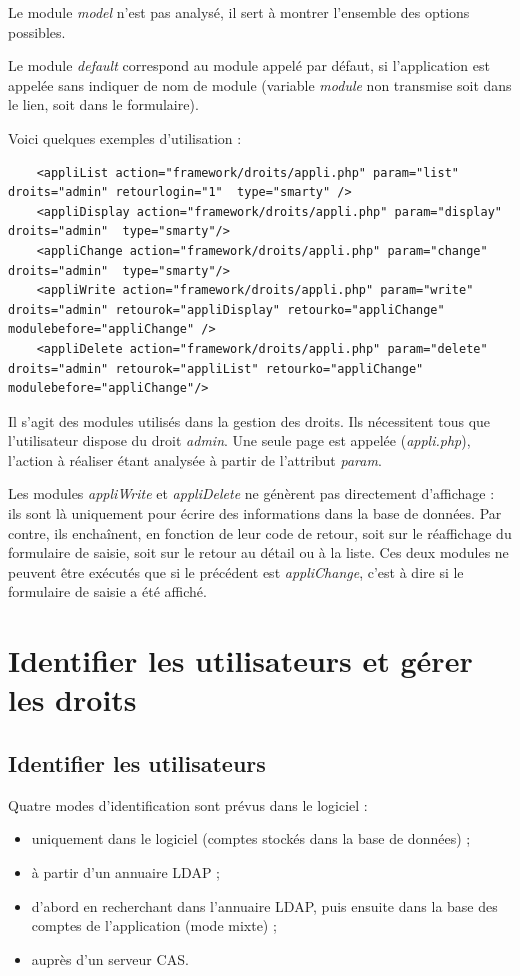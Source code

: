 Le module \textit{model} n'est pas analysé, il sert à montrer l'ensemble des options possibles. 

Le module \textit{default} correspond au module appelé par défaut, si l'application est appelée sans indiquer de nom de module (variable \textit{module} non transmise soit dans le lien, soit dans le formulaire).

Voici quelques exemples d'utilisation :
\begin{lstlisting}
	<appliList action="framework/droits/appli.php" param="list" droits="admin" retourlogin="1"  type="smarty" />
	<appliDisplay action="framework/droits/appli.php" param="display" droits="admin"  type="smarty"/>
	<appliChange action="framework/droits/appli.php" param="change" droits="admin"  type="smarty"/>
	<appliWrite action="framework/droits/appli.php" param="write" droits="admin" retourok="appliDisplay" retourko="appliChange" modulebefore="appliChange" />
	<appliDelete action="framework/droits/appli.php" param="delete" droits="admin" retourok="appliList" retourko="appliChange"  modulebefore="appliChange"/>
\end{lstlisting}

Il s'agit des modules utilisés dans la gestion des droits. Ils nécessitent tous que l'utilisateur dispose du droit \textit{admin}. Une seule page est appelée (\textit{appli.php}), l'action à réaliser étant analysée à partir de l'attribut \textit{param}.

Les modules \textit{appliWrite} et \textit{appliDelete} ne génèrent pas directement d'affichage : ils sont là uniquement pour écrire des informations dans la base de données. Par contre, ils enchaînent, en fonction de leur code de retour, soit sur le réaffichage du formulaire de saisie, soit sur le retour au détail ou à la liste.
Ces deux modules ne peuvent être exécutés que si le précédent est \textit{appliChange}, c'est à dire si le formulaire de saisie a été affiché.

\chapter{Identifier les utilisateurs et gérer les droits}\label{droits}
\section{Identifier les utilisateurs}

Quatre modes d'identification sont prévus dans le logiciel :
\begin{itemize}
\item uniquement dans le logiciel (comptes stockés dans la base de données) ;
\item à partir d'un annuaire LDAP ;
\item d'abord en recherchant dans l'annuaire LDAP, puis ensuite dans la base des comptes de l'application (mode mixte) ;
\item auprès d'un serveur CAS.
\end{itemize}

